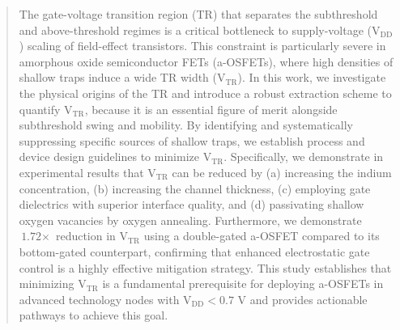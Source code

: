 \documentclass[journal,twoside,web]{ieeecolor}
\begin{document}
\begin{abstract}

The gate-voltage transition region (TR) that separates the subthreshold and above-threshold regimes is a critical bottleneck to supply-voltage ($\text{V}_{\text{DD}}$) scaling of field-effect transistors. This constraint is particularly severe in amorphous oxide semiconductor FETs (a-OSFETs), where high densities of shallow traps induce a wide TR width ($\text{V}_{\text{TR}}$). In this work, we investigate the physical origins of the TR and introduce a robust extraction scheme to quantify $\text{V}_{\text{TR}}$, because it is an essential figure of merit alongside subthreshold swing and mobility. By identifying and systematically suppressing specific sources of shallow traps, we establish process and device design guidelines to minimize $\text{V}_{\text{TR}}$. Specifically, we demonstrate in experimental results that $\text{V}_{\text{TR}}$ can be reduced by (a) increasing the indium concentration, (b) increasing the channel thickness, (c) employing gate dielectrics with superior interface quality, and (d) passivating shallow oxygen vacancies by oxygen annealing. Furthermore, we demonstrate $\text{1.72}\times$ reduction in $\text{V}_{\text{TR}}$ using a double-gated a-OSFET compared to its bottom-gated counterpart, confirming that enhanced electrostatic gate control is a highly effective mitigation strategy. This study establishes that minimizing $\text{V}_{\text{TR}}$ is a fundamental prerequisite for deploying a-OSFETs in advanced technology nodes with $\text{V}_{\text{DD}} < \text{0.7}$ V and provides actionable pathways to achieve this goal.

\end{abstract}
\end{document}
